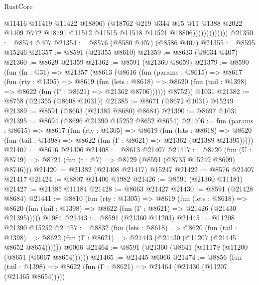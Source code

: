 \begin{lexlean}{RustCore}
\begin{coremodule}
                              @11416
                              @11419
                              @11422
                              @18806)
                            (@18762
                              @219
                              @344
                              @15
                              @11
                              @1388
                              @2022
                              @1409
                              @772
                              @18791
                              @11512
                              @11515
                              @11518
                              @11521
                              @18806)))))))))))))
@21350 := @8574 @407
@21354 := @8576 (@8580 @407) (@8586 @407)
@21355 := @8595 @15246
@21357 := @8591 (@21355 @8610)
@21359 := @8633 (@8634 @407)
@21360 := @8629 @21359
@21362 := @8591 (@21360 @8659)
@21379 := @8590
    (fun (fn : @31) =>
    @21357
      (@8613
        (@8616
          (fun (params : @8615) =>
          @8617
            (fun (rty : @1305) =>
            @8619
              (fun (lets : @8618) =>
              @8620 (fun (tail : @1398) => @8622 (fun (Γ : @8621) => @21362 @8706))))))
        @8752))
    @1031
@21382 := @8758 (@21355 (@8608 @1031))
@21385 := @8671 (@8672 @1031) @15249
@21389 := @8591 (@8663 (@21385 @8680) @8684)
@21390 := @8697 @1031
@21395 := @8694 (@8696 @21390 @15252 @8652 @8654)
@21406 := fun (params : @8615) =>
  @8617
    (fun (rty : @1305) =>
    @8619
      (fun (lets : @8618) =>
      @8620 (fun (tail : @1398) => @8622 (fun (Γ : @8621) => @21362 (@21389 @21395)))))
@21407 := @8616 @21406
@21408 := @8613 @21407
@21417 := @8720
    (fun (U : @8719) => @8721 (fun (t : @7) => @8729 (@8591 (@8735 @15249 @8609) @8746)))
@21420 := @21382 (@21408 @21417) @15247
@21422 := @8576 @21407 @21417
@21424 := @8807 @21406 @1982
@21426 := @8591 (@21360 @11181)
@21427 := @21385 @11184
@21428 := @8663 @21427
@21430 := @8591 (@21428 @8684)
@21441 := @8810
    (fun (rty : @1305) =>
    @8619
      (fun (lets : @8618) =>
      @8620 (fun (tail : @1398) => @8622 (fun (Γ : @8621) => @21426 (@21430 @21395)))))
    @1984
@21443 := @8591 (@21360 @11203)
@21445 := @11208 @21390 @15252
@21457 := @8832
    (fun (lets : @8618) =>
    @8620
      (fun (tail : @1398) =>
      @8622 (fun (Γ : @8621) => @21443 (@21430 (@11207 (@21445 @8652 @8654))))))
    @6066
@21464 := @8591 (@21360 (@8641 (@11179 (@11200 (@8651 (@6067 @8654))))))
@21465 := @21445 @6066
@21474 := @8856
    (fun (tail : @1398) => @8622 (fun (Γ : @8621) => @21464 (@21430 (@11207 (@21465 @8654)))))

\end{coremodule}
\end{lexlean}
